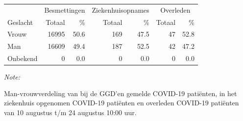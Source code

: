 \documentclass[
  english,
  man,floatsintext]{apa6}
\begin{document}
\begin{table}
\centering\begingroup\fontsize{11}{13}\selectfont

\begin{threeparttable}
\begin{tabular}{lrrrrrr}
\toprule
\multicolumn{1}{c}{ } & \multicolumn{2}{c}{Besmettingen} & \multicolumn{2}{c}{Ziekenhuisopnames} & \multicolumn{2}{c}{Overleden} \\
\cmidrule(l{3pt}r{3pt}){2-3} \cmidrule(l{3pt}r{3pt}){4-5} \cmidrule(l{3pt}r{3pt}){6-7}
Geslacht & Totaal & \% & Totaal & \% & Totaal & \%\\
\midrule
Vrouw & 16995 & 50.6 & 169 & 47.5 & 47 & 52.8\\
Man & 16609 & 49.4 & 187 & 52.5 & 42 & 47.2\\
Onbekend & 0 & 0.0 & 0 & 0.0 & 0 & 0.0\\
\bottomrule
\end{tabular}
\begin{tablenotes}
\item \textit{Note: } 
\item Man-vrouwverdeling van bij de GGD’en gemelde COVID-19 patiënten, in het ziekenhuis opgenomen COVID-19 patiënten en overleden COVID-19 patiënten van 10 augustus t/m 24 augustus 10:00 uur.
\end{tablenotes}
\end{threeparttable}
\endgroup{}
\end{table}
\newpage
\end{document}
